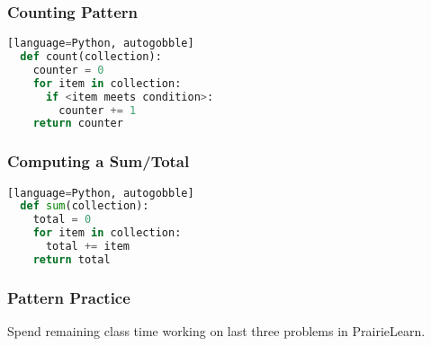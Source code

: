 \documentclass{beamer}
\begin{document}
%
%
\begin{frame}[fragile]
  \frametitle{Counting Pattern}
  \begin{lstlisting}[language=Python, autogobble][language=Python, autogobble]
  def count(collection):
    counter = 0
    for item in collection:
      if <item meets condition>:
        counter += 1
    return counter
  \end{lstlisting}
\end{frame}

%
%
\begin{frame}[fragile]
  \frametitle{Computing a Sum/Total}
  \begin{lstlisting}[language=Python, autogobble][language=Python, autogobble]
  def sum(collection):
    total = 0
    for item in collection:
      total += item
    return total
  \end{lstlisting}
\end{frame}


%
%
\begin{frame}[fragile]
  \frametitle{Pattern Practice}
  Spend remaining class time working on last three problems in PrairieLearn.
\end{frame}
\end{document}
